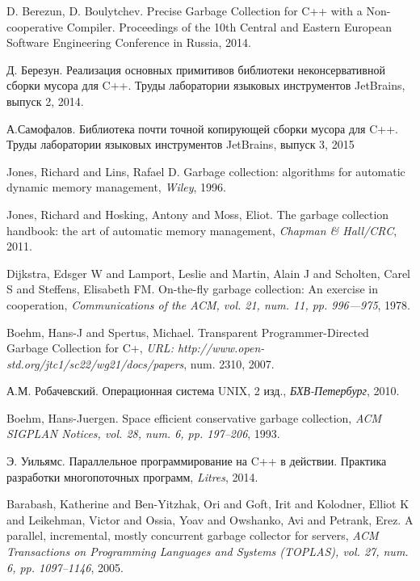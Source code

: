\begin{thebibliography}{99}

    D. Berezun, D. Boulytchev.
    Precise Garbage Collection for C++ with a Non-cooperative Compiler.
    Proceedings of the 10th Central and Eastern European Software Engineering Conference 
    in Russia, 2014.

    Д. Березун.
    Реализация основных примитивов библиотеки неконсервативной сборки мусора для C++.
    Труды лаборатории языковых инструментов JetBrains, выпуск 2, 2014.

    А.Самофалов.
    Библиотека почти точной копирующей сборки мусора для C++.
    Труды лаборатории языковых инструментов JetBrains, выпуск 3, 2015

    Jones, Richard and Lins, Rafael D.
    Garbage collection: algorithms for automatic dynamic memory management,
    \emph{Wiley}, 1996.

    Jones, Richard and Hosking, Antony and Moss, Eliot.
    The garbage collection handbook: the art of automatic memory management,
    \emph{Chapman \& Hall/CRC}, 2011.

    Dijkstra, Edsger W and Lamport, Leslie and Martin, Alain J and Scholten, Carel S and 
    Steffens, Elisabeth FM.
    On-the-fly garbage collection: An exercise in cooperation, 
    \emph{Communications of the ACM, vol. 21, num. 11, pp. 996---975}, 1978.

    Boehm, Hans-J and Spertus, Michael.
    Transparent Programmer-Directed Garbage Collection for C+,
    \emph{URL: http://www.open-std.org/jtc1/sc22/wg21/docs/papers},
    num. 2310, 2007.

    А.М. Робачевский.
    Операционная система UNIX, 2 изд.,
    \emph{БХВ-Петербург}, 2010.

    Boehm, Hans-Juergen. 
    Space efficient conservative garbage collection, 
    \emph{ACM SIGPLAN Notices, vol. 28, num. 6, pp. 197--206},
    1993.

    Э. Уильямс.
    Параллельное программирование на C++ в действии. Практика разработки многопоточных программ,
    \emph{Litres}, 2014.

    Barabash, Katherine and Ben-Yitzhak, Ori and Goft, Irit and Kolodner, Elliot K and 
    Leikehman, Victor and Ossia, Yoav and Owshanko, Avi and Petrank, Erez.
    A parallel, incremental, mostly concurrent garbage collector for servers,
    \emph{ACM Transactions on Programming Languages and Systems (TOPLAS),  vol. 27,
    num. 6, pp. 1097--1146}, 2005.

\end{thebibliography}